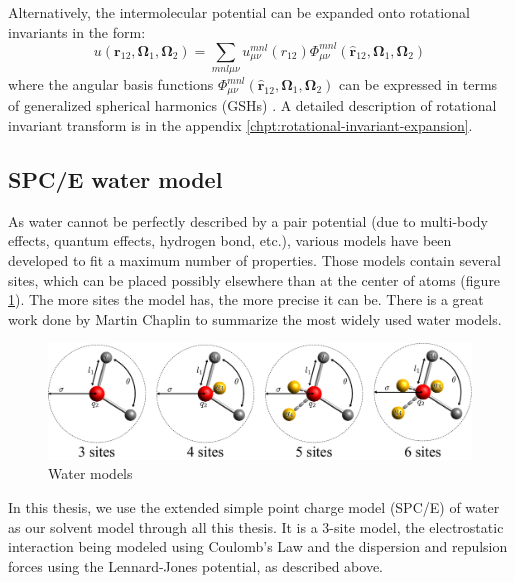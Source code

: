 Alternatively, the intermolecular potential can be expanded onto rotational
invariants in the form:
\begin{equation}
u(\mathbf{r}_{12},\mathbf{\Omega}_{1},\mathbf{\Omega}_{2})=\sum_{mnl\mu\nu}u_{\mu\nu}^{mnl}(r_{12})\Phi_{\mu\nu}^{mnl}(\hat{\mathbf{r}}_{12},\mathbf{\Omega}_{1},\mathbf{\Omega}_{2})
\end{equation}
where the angular basis functions $\Phi_{\mu\nu}^{mnl}(\hat{\mathbf{r}}_{12},\mathbf{\Omega}_{1},\mathbf{\Omega}_{2})$
can be expressed in terms of generalized spherical harmonics (\acs{GSH}s)
\citep{Gray-Gubbins}. A detailed description of rotational invariant
transform is in the appendix \ref{chpt:rotational-invariant-expansion}.

\subsection{SPC/E water model}

As water cannot be perfectly described by a pair potential (due to
multi-body effects, quantum effects, hydrogen bond, etc.), various
models have been developed to fit a maximum number of properties.
Those models contain several sites, which can be placed possibly elsewhere
than at the center of atoms (figure \ref{fig:Water-models}). The
more sites the model has, the more precise it can be. There is a great
work done by Martin Chaplin \citep{water-model} to summarize the
most widely used water models.

\begin{figure}[h]
\begin{centering}
\includegraphics[width=0.75\columnwidth]{_figure/water}
\par\end{centering}
\caption{Water models\label{fig:Water-models}}
\end{figure}

In this thesis, we use the extended simple point charge model (SPC/E)
of water \citep{SPC/E} as our solvent model through all this thesis.
 It is a 3-site model, the electrostatic interaction being modeled
using Coulomb's Law and the dispersion and repulsion forces using
the Lennard-Jones potential, as described above.

